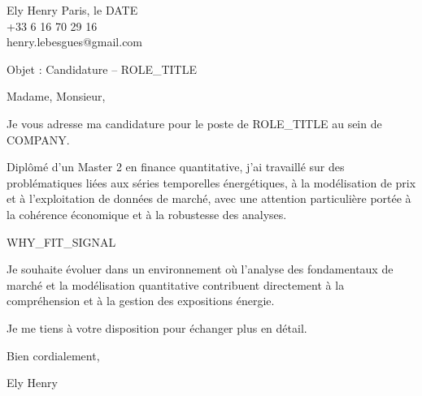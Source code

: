 \documentclass[10pt,a4paper]{article}
\begin{document}
\noindent Ely Henry \hfill Paris, le {{DATE}} \\
+33 6 16 70 29 16 \\
henry.lebesgues@gmail.com \\

\vspace{1cm}

\noindent Objet : Candidature – {{ROLE_TITLE}}

\vspace{0.5cm}

Madame, Monsieur,

\vspace{0.5cm}

Je vous adresse ma candidature pour le poste de {{ROLE_TITLE}} au sein de {{COMPANY}}.

Diplômé d’un Master 2 en finance quantitative, j’ai travaillé sur des problématiques liées aux séries temporelles énergétiques, à la modélisation de prix et à l’exploitation de données de marché, avec une attention particulière portée à la cohérence économique et à la robustesse des analyses.

{{WHY_FIT_SIGNAL}}

Je souhaite évoluer dans un environnement où l’analyse des fondamentaux de marché et la modélisation quantitative contribuent directement à la compréhension et à la gestion des expositions énergie.

Je me tiens à votre disposition pour échanger plus en détail.

Bien cordialement,

\vspace{1cm}

\noindent Ely Henry
\end{document}
